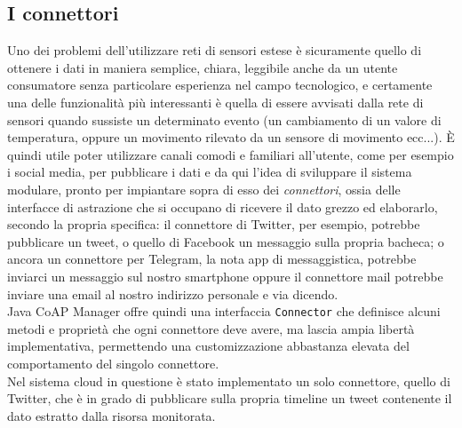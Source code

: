 \subsection{I connettori}
Uno dei problemi dell'utilizzare reti di sensori estese è sicuramente quello di ottenere i dati in maniera semplice, chiara, leggibile anche da un utente consumatore senza particolare esperienza nel campo tecnologico, e certamente una delle funzionalità più interessanti è quella di essere avvisati dalla rete di sensori quando sussiste un determinato evento (un cambiamento di un valore di temperatura, oppure un movimento rilevato da un sensore di movimento ecc...). È quindi utile poter utilizzare canali comodi e familiari all'utente, come per esempio i social media, per pubblicare i dati e da qui l'idea di sviluppare il sistema modulare, pronto per impiantare sopra di esso dei \textit{connettori}, ossia delle interfacce di astrazione che si occupano di ricevere il dato grezzo ed elaborarlo, secondo la propria specifica: il connettore di Twitter, per esempio, potrebbe pubblicare un tweet, o quello di Facebook un messaggio sulla propria bacheca; o ancora un connettore per Telegram, la nota app di messaggistica, potrebbe inviarci un messaggio sul nostro smartphone oppure il connettore mail potrebbe inviare una email al nostro indirizzo personale e via dicendo.
\\Java CoAP Manager offre quindi una interfaccia {\tt Connector} che definisce alcuni metodi e proprietà che ogni connettore deve avere, ma lascia ampia libertà implementativa, permettendo una customizzazione abbastanza elevata del comportamento del singolo connettore.
\\Nel sistema cloud in questione è stato implementato un solo connettore, quello di Twitter, che è in grado di pubblicare sulla propria timeline un tweet contenente il dato estratto dalla risorsa monitorata.

